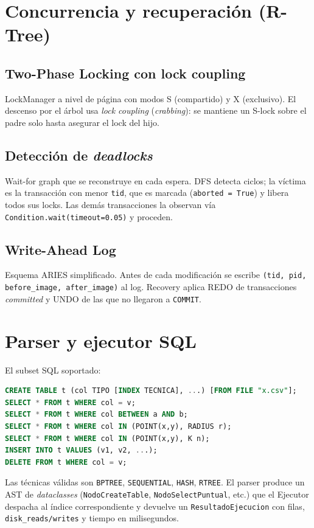 \documentclass[11pt,a4paper]{article}
\begin{document}
\section{Concurrencia y recuperación (R-Tree)}

\subsection{Two-Phase Locking con lock coupling}
\textsf{LockManager} a nivel de página con modos S (compartido) y X
(exclusivo). El descenso por el árbol usa \emph{lock coupling}
(\textit{crabbing}): se mantiene un S-lock sobre el padre solo hasta
asegurar el lock del hijo.

\subsection{Detección de \emph{deadlocks}}
Wait-for graph que se reconstruye en cada espera. DFS detecta ciclos; la
víctima es la transacción con menor \texttt{tid}, que es marcada
(\texttt{aborted = True}) y libera todos sus locks. Las demás
transacciones la observan vía \texttt{Condition.wait(timeout=0.05)} y
proceden.

\subsection{Write-Ahead Log}
Esquema ARIES simplificado. Antes de cada modificación se escribe
\texttt{(tid, pid, before\_image, after\_image)} al log. Recovery aplica
REDO de transacciones \emph{committed} y UNDO de las que no llegaron a
\texttt{COMMIT}.

\section{Parser y ejecutor SQL}

El subset SQL soportado:
\begin{lstlisting}[language=SQL,caption={Gramática soportada}]
CREATE TABLE t (col TIPO [INDEX TECNICA], ...) [FROM FILE "x.csv"];
SELECT * FROM t WHERE col = v;
SELECT * FROM t WHERE col BETWEEN a AND b;
SELECT * FROM t WHERE col IN (POINT(x,y), RADIUS r);
SELECT * FROM t WHERE col IN (POINT(x,y), K n);
INSERT INTO t VALUES (v1, v2, ...);
DELETE FROM t WHERE col = v;
\end{lstlisting}

Las técnicas válidas son \texttt{BPTREE}, \texttt{SEQUENTIAL},
\texttt{HASH}, \texttt{RTREE}. El parser produce un AST de
\textit{dataclasses} (\texttt{NodoCreateTable},
\texttt{NodoSelectPuntual}, etc.) que el \textsf{Ejecutor} despacha al
índice correspondiente y devuelve un \texttt{ResultadoEjecucion} con
filas, \texttt{disk\_reads/writes} y tiempo en milisegundos.
\end{document}
